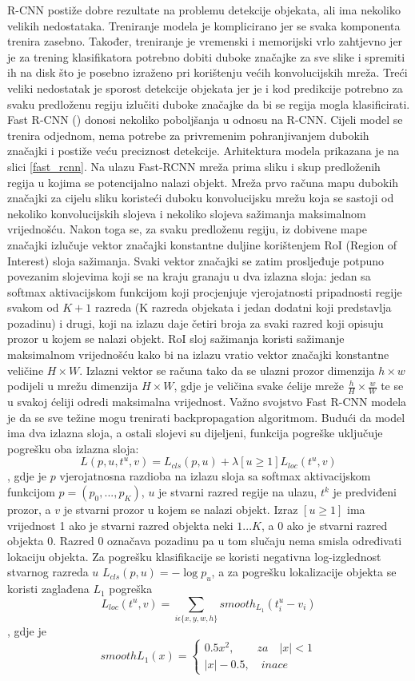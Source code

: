 R-CNN postiže dobre rezultate na problemu detekcije objekata, ali ima nekoliko velikih nedostataka. Treniranje modela je komplicirano jer se svaka komponenta trenira zasebno. Također, treniranje je vremenski i memorijski vrlo zahtjevno jer je za trening klasifikatora potrebno dobiti duboke značajke za sve slike i spremiti ih na disk što je posebno izraženo pri korištenju većih konvolucijskih mreža. Treći veliki nedostatak je sporost detekcije objekata jer je i kod predikcije potrebno za svaku predloženu regiju izlučiti duboke značajke da bi se regija mogla klasificirati.
Fast R-CNN (\cite{DBLP:journals/corr/Girshick15}) donosi nekoliko poboljšanja u odnosu na R-CNN. Cijeli model se trenira odjednom, nema potrebe za privremenim pohranjivanjem dubokih značajki i postiže veću preciznost detekcije.
Arhitektura modela prikazana je na slici \ref{fast_rcnn}. Na ulazu Fast-RCNN mreža prima sliku i skup predloženih regija u kojima se potencijalno nalazi objekt. Mreža prvo računa mapu dubokih značajki za cijelu sliku koristeći duboku konvolucijsku mrežu koja se sastoji od nekoliko konvolucijskih slojeva i nekoliko slojeva sažimanja maksimalnom vrijednošću. Nakon toga se, za svaku predloženu regiju, iz dobivene mape značajki izlučuje vektor značajki konstantne duljine korištenjem RoI (Region of Interest) sloja sažimanja. Svaki vektor značajki se zatim prosljeđuje potpuno povezanim slojevima koji se na kraju granaju u dva izlazna sloja: jedan sa softmax aktivacijskom funkcijom koji procjenjuje vjerojatnosti pripadnosti regije svakom od $K + 1$ razreda (K razreda objekata i jedan dodatni koji predstavlja pozadinu) i drugi, koji na izlazu daje četiri broja za svaki razred koji opisuju prozor u kojem se nalazi objekt. 
RoI sloj sažimanja koristi sažimanje maksimalnom vrijednošću kako bi na izlazu vratio vektor značajki konstantne veličine $H \times W$. Izlazni vektor se računa tako da se ulazni prozor dimenzija $h \times w$ podijeli u mrežu dimenzija $H \times W$, gdje je veličina svake ćelije mreže $\frac{h}{H} \times \frac{w}{W}$ te se u svakoj ćeliji odredi maksimalna vrijednost.
Važno svojstvo Fast R-CNN modela je da se sve težine mogu trenirati backpropagation algoritmom. Budući da model ima dva izlazna sloja, a ostali slojevi su dijeljeni, funkcija pogreške uključuje pogrešku oba izlazna sloja:
\[
L(p, u, t^u , v) = L_{cls}(p, u) + \lambda [u \geq 1]L_{loc}(t^u, v)
\]
, gdje je $p$ vjerojatnosna razdioba na izlazu sloja sa softmax aktivacijskom funkcijom $p = (p_0, ..., p_K)$, $u$ je stvarni razred regije na ulazu, $t^k$ je predviđeni prozor, a $v$ je stvarni prozor u kojem se nalazi objekt. Izraz $[u \geq 1]$ ima vrijednost 1 ako je stvarni razred objekta neki $1...K$, a 0 ako je stvarni razred objekta 0. Razred 0 označava pozadinu pa u tom slučaju nema smisla određivati lokaciju objekta. Za pogrešku klasifikacije se koristi negativna log-izglednost stvarnog razreda $u$ $L_{cls}(p, u) = - \log p_u$, a za pogrešku lokalizacije objekta se koristi zaglađena $L_1$ pogreška
\[
L_{loc}(t^u, v) = \sum\limits_{i \epsilon \{ x, y, w, h \}} smooth_{L_1} (t^u_i - v_i)
\]
, gdje je
\[
smooth{L_1}(x) = 
	\begin{cases}
		0.5x^2, \quad \quad za \quad |x| < 1 \\
		|x| - 0.5, \quad inace
	\end{cases}
\]


